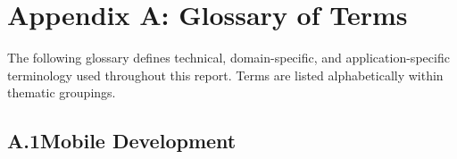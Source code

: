 
\chapter*{Appendix A: Glossary of Terms}
\label{appendix:glossary}

The following glossary defines technical, domain-specific, and
application-specific terminology used throughout this report. Terms are
listed alphabetically within thematic groupings.

\section*{A.1\quad Mobile Development}

